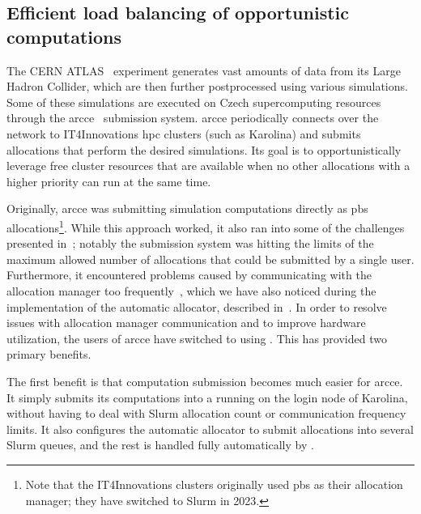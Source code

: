 \subsection{Efficient load balancing of opportunistic computations}
The CERN ATLAS~\cite{atlas} experiment generates vast amounts of data from its Large
Hadron Collider, which are then further postprocessed using various simulations. Some of these
simulations are executed on Czech supercomputing resources through the
\gls{arcce}~\cite{atlas-it4i-1} submission system. \gls{arcce}
periodically connects over the network to IT4Innovations \gls{hpc} clusters (such as
Karolina) and submits allocations that perform the desired simulations. Its goal is to
opportunistically leverage free cluster resources that are available when no other allocations with
a higher priority can run at the same time.

Originally, \gls{arcce} was submitting simulation computations directly as
\gls{pbs} allocations\footnote{Note that the IT4Innovations clusters originally used \gls{pbs} as their allocation
manager; they have switched to Slurm in 2023.}. While this approach worked, it also
ran into some of the challenges presented in~; notably the submission system
was hitting the limits of the maximum allowed number of allocations that could be submitted by a
single user. Furthermore, it encountered problems caused by communicating with the allocation
manager too frequently~\cite{atlas-it4i-2}, which we have also noticed during the
implementation of the \hyperqueue{} automatic allocator, described
in~. In order to resolve issues with allocation manager communication and to
improve hardware utilization, the users of \gls{arcce} have switched to using
\hyperqueue{}. This has provided two primary benefits.

The first benefit is that computation submission becomes much easier for \gls{arcce}.
It simply submits its computations into a \hyperqueue{} running on the login node of
Karolina, without having to deal with Slurm allocation count or communication frequency limits. It
also configures the automatic allocator to submit allocations into several Slurm queues, and the
rest is handled fully automatically by \hyperqueue{}.

